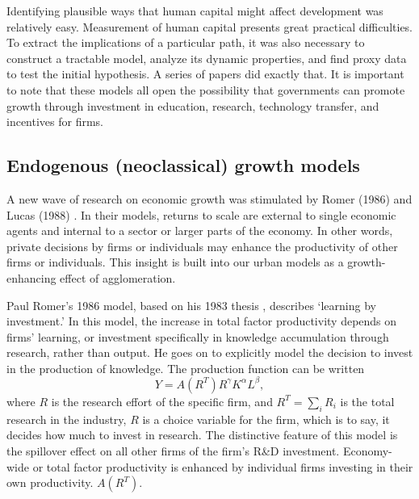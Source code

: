 {%



Identifying  plausible ways that human capital might affect development was relatively easy. Measurement of human capital presents great practical difficulties. To extract the implications of a particular path, it was also necessary to construct a tractable model, analyze its dynamic properties, and find proxy data to test the initial hypothesis.   A series of papers did exactly that. It is important to note that these models all open the possibility that governments can  promote growth through investment in education, research, technology transfer, and incentives for firms.

\subsection{Endogenous (neoclassical) growth models}
A new wave of research on economic growth was stimulated by Romer (1986) and Lucas (1988) \cite{REF_AGAIN}. In their models, returns to scale are external to single economic agents and internal to a sector or larger parts of the economy. In other words, private decisions by firms or individuals may enhance the productivity of other firms or individuals. This insight is built into our urban models as a growth-enhancing effect of agglomeration. 


Paul Romer's 1986  model, based on his 1983 thesis \cite{GET_REF}, describes `learning by investment.' In this model, the increase in {total factor productivity} depends on firms' learning, or investment specifically in knowledge accumulation through research, rather than output. He goes on to  explicitly model the decision to invest in the production of knowledge. The production function  can be written
\[Y = A(R^T)R^\gamma  K^\alpha L^\beta, \]
where $R$ is the research effort of the specific firm, and $R^T=\sum_iR_i$ is the total research in the industry,  $R$ is a choice variable for the firm, which is to say, it decides how much to invest in research. The distinctive  feature of this model is the spillover effect on all other firms of the firm's R\&D investment. Economy-wide or  \gls{total factor productivity} is enhanced by individual firms investing in their own productivity. $A(R^T)$. %

}
